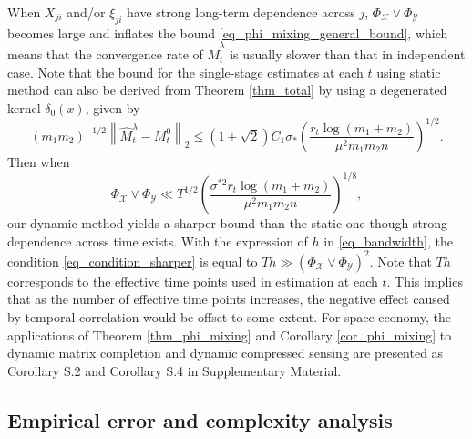 \documentclass[12pt]{article}
\begin{document}
  When $X_{ji}$ and/or $\xi_{ji}$ have strong long-term dependence across $j$, $\Phi_\mathcal{X}\vee \Phi_{\mathcal{Y}}$ becomes large and inflates the bound \eqref{eq_phi_mixing_general_bound}, which means that the convergence rate of $\widetilde{M}_t^\lambda$ is usually slower than that in independent case. 
  Note that the bound for the single-stage estimates at each $t$ using static method can also be derived from Theorem \ref{thm_total} by using a degenerated kernel $\delta_0(x)$, given by
  \begin{equation*}
  (m_1m_2)^{-1/2}\left\|\widehat{M}_t^\lambda - M_t^0\right\|_2 \le (1+\sqrt{2})C_1\sigma_*\left(\frac{r_t\log(m_1+m_2)}{\mu^2m_1m_2n}\right)^{1/2}.
  \end{equation*}
  Then when %
  \begin{equation}
  \label{eq_condition_sharper}
  \Phi_{\mathcal{X}}\vee \Phi_{\mathcal{Y}} \ll T^{1/2}\left(\frac{\sigma^{*2}r_t\log(m_1+m_2)}{\mu^2 m_1 m_2 n}\right)^{1/8},
  \end{equation} 
  our dynamic method yields a sharper bound than the static one though strong dependence across time exists. With the expression of $h$ in \eqref{eq_bandwidth}, the condition \eqref{eq_condition_sharper} is equal to
  $T h \gg (\Phi_{\mathcal{X}}\vee \Phi_{\mathcal{Y}})^2$. 
  Note that $Th$ corresponds to the effective time points used in estimation at each $t$. This implies that as the number of effective time points increases, the negative effect caused by temporal correlation would be offset to some extent. %
For space economy, the applications of Theorem \ref{thm_phi_mixing} and Corollary \ref{cor_phi_mixing} to dynamic matrix completion and dynamic compressed sensing are presented as Corollary S.2 and Corollary S.4 in Supplementary Material.
  
\subsection{Empirical error and complexity analysis}
\label{algorithm}
\end{document}
